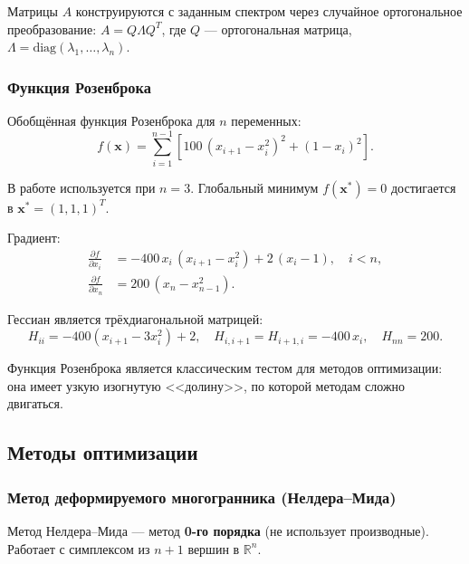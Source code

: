 \documentclass[a4paper, 14pt]{extarticle}
\begin{document}
Матрицы $A$ конструируются с заданным спектром через случайное ортогональное преобразование: $A = Q \Lambda Q^T$, где $Q$ --- ортогональная матрица, $\Lambda = \mathrm{diag}(\lambda_1, \ldots, \lambda_n)$.

\subsubsection{Функция Розенброка}

Обобщённая функция Розенброка для $n$ переменных:
\begin{equation}\label{eq:rosenbrock}
    f(\mathbf{x}) = \sum_{i=1}^{n-1} \left[ 100\,(x_{i+1} - x_i^2)^2 + (1 - x_i)^2 \right].
\end{equation}

В работе используется при $n = 3$. Глобальный минимум $f(\mathbf{x}^*) = 0$ достигается в $\mathbf{x}^* = (1, 1, 1)^T$.

Градиент:
\begin{align}
    \frac{\partial f}{\partial x_i} &= -400\,x_i\,(x_{i+1} - x_i^2) + 2\,(x_i - 1), \quad i < n, \\
    \frac{\partial f}{\partial x_n} &= 200\,(x_n - x_{n-1}^2).
\end{align}

Гессиан является трёхдиагональной матрицей:
\[
    H_{ii} = -400(x_{i+1} - 3x_i^2) + 2, \quad
    H_{i,i+1} = H_{i+1,i} = -400\,x_i, \quad
    H_{nn} = 200.
\]

Функция Розенброка является классическим тестом для методов оптимизации: она имеет узкую изогнутую <<долину>>, по которой методам сложно двигаться.

\subsection{Методы оптимизации}

\subsubsection{Метод деформируемого многогранника (Нелдера--Мида)}

Метод Нелдера--Мида --- метод \textbf{0-го порядка} (не использует производные). Работает с симплексом из $n+1$ вершин в $\mathbb{R}^n$.
\end{document}
